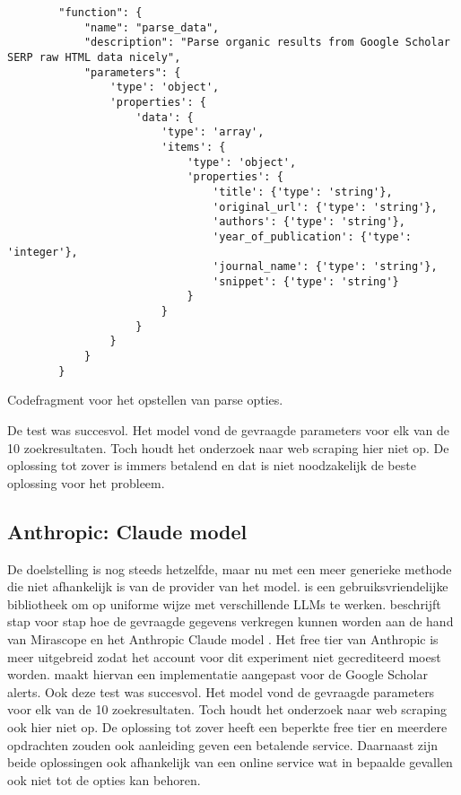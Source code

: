 \begin{listing}
    \begin{verbatim}
        "function": {
            "name": "parse_data",
            "description": "Parse organic results from Google Scholar SERP raw HTML data nicely",
            "parameters": {
                'type': 'object',
                'properties': {
                    'data': {
                        'type': 'array',
                        'items': {
                            'type': 'object',
                            'properties': {
                                'title': {'type': 'string'},
                                'original_url': {'type': 'string'},
                                'authors': {'type': 'string'},
                                'year_of_publication': {'type': 'integer'},
                                'journal_name': {'type': 'string'},
                                'snippet': {'type': 'string'}
                            }
                        }
                    }
                }
            }
        }
    \end{verbatim}
    \caption[Parse opties codefragment]{Codefragment voor het opstellen van parse opties.}
    \label{code:Parse opties codefragment}
\end{listing}
De test was succesvol. Het model vond de gevraagde parameters voor elk van de 10 zoekresultaten. Toch houdt het onderzoek naar web scraping hier niet op. De oplossing tot zover is immers betalend en dat is niet noodzakelijk de beste oplossing voor het probleem.

\subsection{Anthropic: Claude model}
De doelstelling is nog steeds hetzelfde, maar nu met een meer generieke methode die niet afhankelijk is van de provider van het model.
\textcite{Mirascope2025} is een gebruiksvriendelijke bibliotheek om op uniforme wijze met verschillende LLMs te werken.
\textcite{Anthropic2025} beschrijft stap voor stap hoe de gevraagde gegevens verkregen kunnen worden aan de hand van Mirascope en het Anthropic Claude model \autocite{Anthropicmodel2025}. Het free tier van Anthropic is meer uitgebreid zodat het account voor dit experiment niet gecrediteerd moest worden.
\textcite{Depaepeanthropic2025} maakt hiervan een implementatie aangepast voor de Google Scholar alerts.
Ook deze test was succesvol. Het model vond de gevraagde parameters voor elk van de 10 zoekresultaten. Toch houdt het onderzoek naar web scraping ook hier niet op. De oplossing tot zover heeft een beperkte free tier en meerdere opdrachten zouden ook aanleiding geven een betalende service.
Daarnaast zijn beide oplossingen ook afhankelijk van een online service wat in bepaalde gevallen ook niet tot de opties kan behoren.
